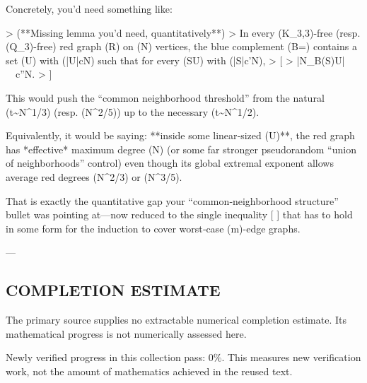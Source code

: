 Concretely, you’d need something like:

> (**Missing lemma you’d need, quantitatively**)
> In every (K_{3,3})-free (resp. (Q_3)-free) red graph (R) on (N) vertices, the blue complement (B=) contains a set (U) with (|U|\ge cN) such that for every (S\subseteq U) with (|S|\le c'\sqrt N),
> [
> |N_B(S)\cap U|\ \ge\ c''N.
> ]

This would push the “common neighborhood threshold” from the natural (t\sim N^{1/3}) (resp. (N^{2/5})) up to the necessary (t\sim N^{1/2}).

Equivalently, it would be saying: **inside some linear‑sized (U)**, the red graph has *effective* maximum degree (\ll \sqrt N) (or some far stronger pseudorandom “union of neighborhoods” control) even though its global extremal exponent allows average red degrees (N^{2/3}) or (N^{3/5}).

That is exactly the quantitative gap your “common‑neighborhood structure” bullet was pointing at—now reduced to the single inequality
[
]
that has to hold in some form for the induction to cover worst‑case (m)-edge graphs.

---


\subsection*{COMPLETION ESTIMATE}
The primary source supplies no extractable numerical completion estimate. Its mathematical progress is not numerically assessed here.

Newly verified progress in this collection pass: $0\%$. This measures new verification work, not the amount of mathematics achieved in the reused text.
